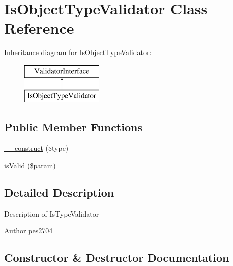 \hypertarget{class_pes_1_1_validator_1_1_is_object_type_validator}{}\section{Is\+Object\+Type\+Validator Class Reference}
\label{class_pes_1_1_validator_1_1_is_object_type_validator}
Inheritance diagram for Is\+Object\+Type\+Validator\+:\begin{figure}[H]
\begin{center}
\leavevmode
\includegraphics[height=2.000000cm]{class_pes_1_1_validator_1_1_is_object_type_validator}
\end{center}
\end{figure}
\subsection*{Public Member Functions}
\begin{DoxyCompactItemize}
\item 
\mbox{\hyperlink{class_pes_1_1_validator_1_1_is_object_type_validator_ac395571e7767c80119b30cf2e5087c59}{\+\_\+\+\_\+construct}} (\$type)
\item 
\mbox{\hyperlink{class_pes_1_1_validator_1_1_is_object_type_validator_a250dbda694ce9c4d0dd4e71e1df35882}{is\+Valid}} (\$param)
\end{DoxyCompactItemize}


\subsection{Detailed Description}
Description of Is\+Type\+Validator

\begin{DoxyAuthor}{Author}
pes2704 
\end{DoxyAuthor}


\subsection{Constructor \& Destructor Documentation}
\mbox{\label{class_pes_1_1_validator_1_1_is_object_type_validator_ac395571e7767c80119b30cf2e5087c59}} 
